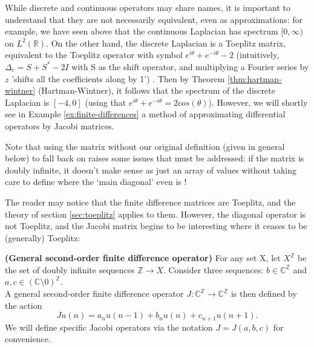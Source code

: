 \documentclass[../main.tex]{subfiles}
\begin{document}
\begin{remark}
  While discrete and continuous operators may share names, it is important to
  understand that they are not necessarily equivalent, even as approximations:
  for example, we have seen above that the continuous Laplacian has spectrum
  $[0, \infty)$ on $L^2(\mathbb{R})$. On the other hand, the discrete Laplacian
  is a Toeplitz matrix, equivalent to the Toeplitz operator with symbol 
  $e^{i \theta} + e^{-i \theta} - 2$ (intuitively, $\Delta_c = S + S^* - 2I$ with S as the
  shift operator, and multiplying a Fourier series by $z$
  'shifts all the coefficients along by 1') \cite{arveson2002short}.
  Then by Theorem \ref{thm:hartman-wintner}
  (Hartman-Wintner), it follows that the spectrum of the discrete Laplacian is
  $[-4, 0]$ (using that $e^{i \theta} + e^{-i \theta} = 2cos(\theta)$).
  However, we will shortly see in Example \ref{ex:finite-differences} a method
  of approximating differential operators by Jacobi matrices.
\end{remark}

Note that using the matrix without our original definition (given in general
below) to fall back on raises some issues that must be addressed: if the matrix
is doubly infinite, it doesn't make sense as just an array of values without
taking care to define where the `main diagonal' even is \cite{lindner2013where}!

The reader may notice that the finite difference matrices are Toeplitz, and the
theory of section \ref{sec:toeplitz} applies to them. However, the diagonal
operator is not Toeplitz, and the Jacobi matrix begins to be interesting where
it ceases to be (generally) Toeplitz:

\begin{definition}{\textbf{(General second-order finite difference operator)}}
  For any set X, let $X^\mathbb{Z}$ be the set of doubly infinite sequences $\mathbb{Z}
  \rightarrow X$. Consider three sequences:
  $b \in \mathbb{C}^\mathbb{Z}$
  and $a, c \in (\mathbb{C} \setminus 0)^\mathbb{Z}$.\\
  A general second-order finite difference operator 
  $J: \mathbb{C}^\mathbb{Z} \rightarrow \mathbb{C}^\mathbb{Z}$
  is then defined by the action 
  \begin{equation}
  \label{eqn:2efde}
    Ju (n) = a_n u(n-1) + b_n u(n) + c_{n+1} u(n+1).
  \end{equation}
  We will define specific Jacobi operators via the notation $J = J(a, b, c)$
  for convenience.
\end{definition}
\end{document}
